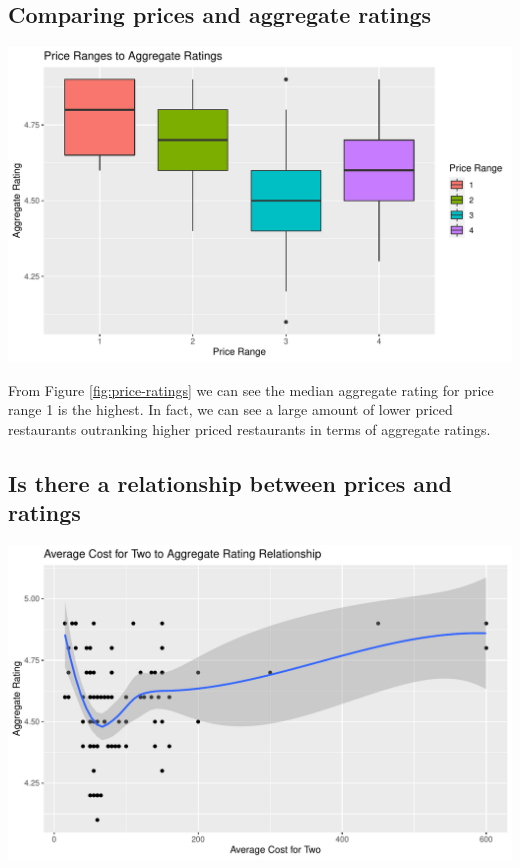 \documentclass[11pt,a4paper,]{article}
\let\origfigure\figure
\let\endorigfigure\endfigure
\renewenvironment{figure}[1][2] {
    \expandafter\origfigure\expandafter[H]
} {
    \endorigfigure
}%
\begin{document}
\hypertarget{comparing-prices-and-aggregate-ratings}{%
\subsection{Comparing prices and aggregate ratings}\label{comparing-prices-and-aggregate-ratings}}

\begin{figure}
\centering
\includegraphics{assignment4_files/figure-latex/price-ratings-1.pdf}
\caption{\label{fig:price-ratings}Price Ranges to Aggregate Ratings}
\end{figure}

From Figure \ref{fig:price-ratings} we can see the median aggregate rating for price range 1 is the highest. In fact, we can see a large amount of lower priced restaurants outranking higher priced restaurants in terms of aggregate ratings.

\hypertarget{is-there-a-relationship-between-prices-and-ratings}{%
\subsection{Is there a relationship between prices and ratings}\label{is-there-a-relationship-between-prices-and-ratings}}

\begin{figure}
\centering
\includegraphics{assignment4_files/figure-latex/cost-rating-relationship-1.pdf}
\caption{\label{fig:cost-rating-relationship}Average Cost for Two to Aggregate Rating Relationship}
\end{figure}
\end{document}
